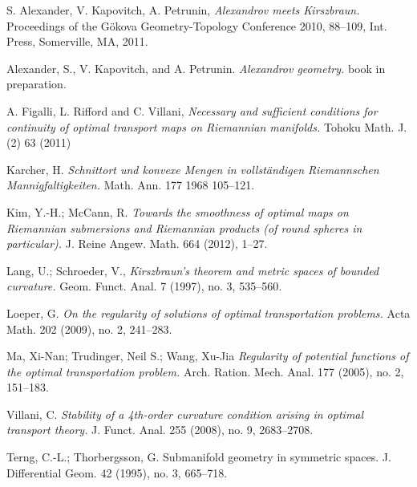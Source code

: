 \documentclass{article}
\begin{document}
\begin{thebibliography}{52}
 S. Alexander, V. Kapovitch, A. Petrunin, 
\emph{Alexandrov meets Kirszbraun.} 
Proceedings of the Gökova Geometry-Topology Conference 2010, 88--109, Int. Press, Somerville, MA, 2011.

 Alexander, S., V. Kapovitch, and A. Petrunin. \emph{Alexandrov geometry.} book in preparation.

 A. Figalli, L. Rifford and C. Villani,
\emph{Necessary and sufficient conditions for continuity of optimal transport maps on Riemannian manifolds.} Tohoku Math. J. (2) 63 (2011)

Karcher, H.
\emph{Schnittort und konvexe Mengen in vollständigen Riemannschen Mannigfaltigkeiten.}
Math. Ann. 177 1968 105--121.

 Kim, Y.-H.; McCann, R.
\emph{Towards the smoothness of optimal maps on Riemannian submersions and Riemannian products (of round spheres in particular).}
J. Reine Angew. Math. 664 (2012), 1--27. 

 Lang, U.; Schroeder, V.,
\emph{Kirszbraun's theorem and metric spaces of bounded curvature.}
Geom. Funct. Anal. 7 (1997), no. 3, 535–560. 

Loeper, G.
\emph{On the regularity of solutions of optimal transportation problems.}
Acta Math. 202 (2009), no. 2, 241–283. 

 Ma, Xi-Nan; Trudinger, Neil S.; Wang, Xu-Jia
\emph{Regularity of potential functions of the optimal transportation problem.}
Arch. Ration. Mech. Anal. 177 (2005), no. 2, 151--183. 

 Villani, C. \emph{Stability of a 4th-order curvature condition arising in optimal transport theory.}
J. Funct. Anal. 255 (2008), no. 9, 2683--2708.


 Terng, C.-L.; Thorbergsson, G. Submanifold geometry in symmetric spaces. J. Differential Geom. 42 (1995), no. 3, 665--718.
 
\end{thebibliography}
\end{document}
